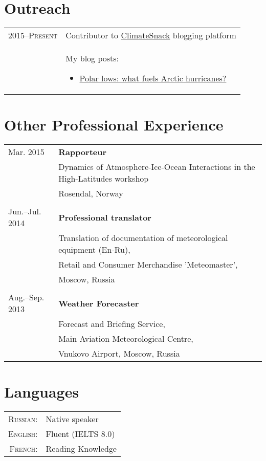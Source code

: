 \documentclass[a4paper,11pt]{article}
\newlength{\mycol}
\begin{document}
\section{Outreach}
\begin{tabu} to 	
 \textsc{2015--\small{Present}} & Contributor to \href{http://www.climatesnack.com/}{ClimateSnack} blogging platform \\
& My blog posts:
\begin{itemize}
\item \href{http://www.climatesnack.com/2015/03/04/polar-lows-what-fuels-arctic-hurricanes/}{Polar lows: what fuels Arctic hurricanes?}
\end{itemize}
\end{tabu}

\section{Other Professional Experience}
\begin{tabu} to 
 {\small Mar.} 2015 & \textbf{Rapporteur} \\
& Dynamics of Atmosphere-Ice-Ocean Interactions in the High-Latitudes workshop \\
& Rosendal, Norway \\
 \\

 {\small Jun.--Jul.} 2014 & \textbf{Professional translator} \\
& Translation of documentation of meteorological equipment (En-Ru), \\
& Retail and Consumer Merchandise 'Meteomaster', \\
& Moscow, Russia \\
 \\

 {\small Aug.--Sep.} 2013 & \textbf{Weather Forecaster} \\
& Forecast and Briefing Service, \\
& Main Aviation Meteorological Centre, \\
& Vnukovo Airport, Moscow, Russia
\end{tabu}

\section{Languages}
\begin{tabular}{rp{10cm}}
\textsc{Russian:} & Native speaker \\
\textsc{English:} & Fluent (IELTS 8.0)\\
\textsc{French:} & Reading Knowledge\\
\end{tabular}
\end{document}
